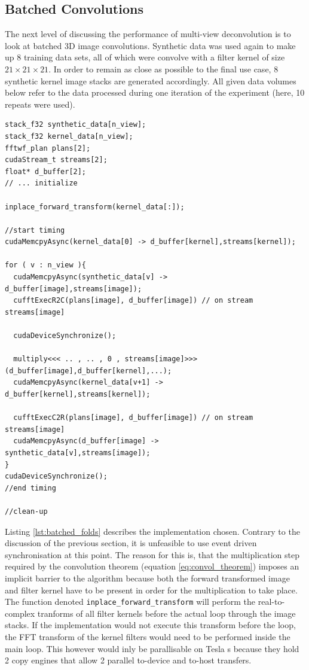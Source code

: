 \clearpage
\subsection{Batched Convolutions}

The next level of discussing the performance of multi-view deconvolution is to look at batched 3D image convolutions. Synthetic data was used again to make up 8 training data sets, all of which were convolve with a filter kernel of size $21 \times 21 \times 21$. In order to remain as close as possible to the final use case, 8 synthetic kernel image stacks are generated accordingly. All given data volumes below refer to the data processed during one iteration of the experiment (here, 10 repeats were used). \newline

\begin{lstlisting}[caption={Asynchronous batched FFT based convolution on synthetic data performed with CUDA. The algorithm is given in pseudo-code based on the CUDA and \cufft{} API.},label={lst:batched_folds}]
stack_f32 synthetic_data[n_view];
stack_f32 kernel_data[n_view];
fftwf_plan plans[2];
cudaStream_t streams[2];
float* d_buffer[2];
// ... initialize 

inplace_forward_transform(kernel_data[:]);

//start timing
cudaMemcpyAsync(kernel_data[0] -> d_buffer[kernel],streams[kernel]);
  
for ( v : n_view ){
  cudaMemcpyAsync(synthetic_data[v] -> d_buffer[image],streams[image]);
  cufftExecR2C(plans[image], d_buffer[image]) // on stream streams[image]
  
  cudaDeviceSynchronize();

  multiply<<< .. , .. , 0 , streams[image]>>>(d_buffer[image],d_buffer[kernel],...);
  cudaMemcpyAsync(kernel_data[v+1] -> d_buffer[kernel],streams[kernel]);
  
  cufftExecC2R(plans[image], d_buffer[image]) // on stream streams[image]
  cudaMemcpyAsync(d_buffer[image] -> synthetic_data[v],streams[image]);
}
cudaDeviceSynchronize();
//end timing

//clean-up
\end{lstlisting}

Listing \ref{lst:batched_folds} describes the implementation chosen. Contrary to the discussion of the previous section, it is unfeasible to use event driven synchronisation at this point. The reason for this is, that the multiplication step required by the convolution theorem (equation \ref{eq:convol_theorem}) imposes an implicit barrier to the algorithm because both the forward transformed image and filter kernel have to be present in order for the multiplication to take place. The function denoted \texttt{inplace\_forward\_transform} will perform the real-to-complex tranforms of all filter kernels before the actual loop through the image stacks. If the implementation would not execute this transform before the loop, the FFT transform of the kernel filters would need to be performed inside the main loop. This however would inly be parallisable on Tesla \gpu{}s because they hold 2 copy engines that allow 2 parallel to-device and to-host transfers.  

